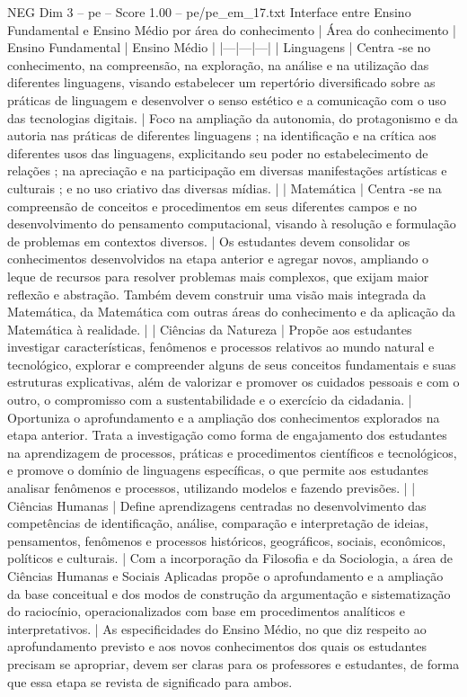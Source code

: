 \begin{textsample}{NEG Dim 3 – pe – Score 1.00 – pe/pe\_em\_17.txt}  \label{ex:f3_neg_018}
Interface entre Ensino Fundamental e Ensino Médio por área do conhecimento | Área do conhecimento | Ensino Fundamental | Ensino Médio | |---|---|---| | Linguagens | Centra -se no conhecimento, na compreensão, na exploração, na análise e na utilização das diferentes linguagens, visando estabelecer um repertório diversificado sobre as práticas de linguagem e desenvolver o senso estético e a comunicação com o uso das tecnologias digitais. | Foco na ampliação da autonomia, do protagonismo e da autoria nas práticas de diferentes linguagens ; na identificação e na crítica aos diferentes usos das linguagens, explicitando seu poder no estabelecimento de relações ; na apreciação e na participação em diversas manifestações artísticas e culturais ; e no uso criativo das diversas mídias. | | Matemática | Centra -se na compreensão de conceitos e procedimentos em seus diferentes campos e no desenvolvimento do pensamento computacional, visando à resolução e formulação de problemas em contextos diversos. | Os estudantes devem consolidar os conhecimentos desenvolvidos na etapa anterior e agregar novos, ampliando o leque de recursos para resolver problemas mais complexos, que exijam maior reflexão e abstração.
Também devem construir uma visão mais integrada da Matemática, da Matemática com outras áreas do conhecimento e da aplicação da Matemática à realidade. | | Ciências da Natureza | Propõe aos estudantes investigar características, fenômenos e processos relativos ao mundo natural e tecnológico, explorar e compreender alguns de seus conceitos fundamentais e suas estruturas explicativas, além de valorizar e promover os cuidados pessoais e com o outro, o compromisso com a sustentabilidade e o exercício da cidadania. | Oportuniza o aprofundamento e a ampliação dos conhecimentos explorados na etapa anterior.
Trata a investigação como forma de engajamento dos estudantes na aprendizagem de processos, práticas e procedimentos científicos e tecnológicos, e promove o domínio de linguagens específicas, o que permite aos estudantes analisar fenômenos e processos, utilizando modelos e fazendo previsões. | | Ciências Humanas | Define aprendizagens centradas no desenvolvimento das competências de identificação, análise, comparação e interpretação de ideias, pensamentos, fenômenos e processos históricos, geográficos, sociais, econômicos, políticos e culturais. | Com a incorporação da Filosofia e da Sociologia, a área de Ciências Humanas e Sociais Aplicadas propõe o aprofundamento e a ampliação da base conceitual e dos modos de construção da argumentação e sistematização do raciocínio, operacionalizados com base em procedimentos analíticos e interpretativos. | As especificidades do Ensino Médio, no que diz respeito ao aprofundamento previsto e aos novos conhecimentos dos quais os estudantes precisam se apropriar, devem ser claras para os professores e estudantes, de forma que essa etapa se revista de significado para ambos.

\end{textsample}
